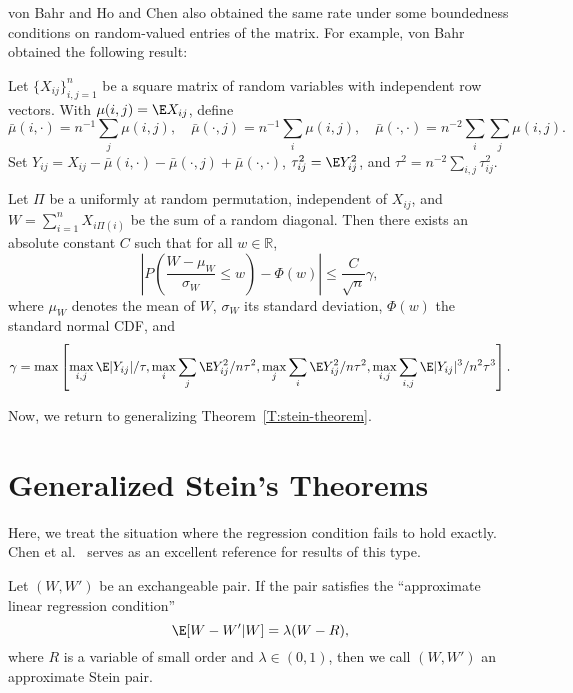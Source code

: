 von Bahr \cite{bahr1976remainder} and Ho and Chen \cite{ho1978l_p}
also obtained the same rate under some boundedness conditions
on random-valued entries of the matrix.  For example, von
Bahr obtained the following result:
\begin{theorem}
  Let $\{X_{ij}\}_{i, j = 1}^n$ be a square matrix of random variables with
  independent row vectors.
  With $\mu(i, j) = \E X_{ij}$, define
  \begin{equation*}
    \bar{\mu}(i, \cdot) = n^{-1} \sum_j \mu(i, j), \quad
    \bar{\mu}(\cdot, j) = n^{-1} \sum_i \mu(i, j), \quad
    \bar{\mu}(\cdot, \cdot) = n^{-2} \sum_i \sum_j \mu(i, j). \quad
  \end{equation*}
  Set $Y_{ij} = X_{ij} - \bar{\mu}(i, \cdot) - \bar{\mu}(\cdot, j) + \bar{\mu}(\cdot, \cdot)$,
  $\tau_{ij}^2 = \E Y_{ij}^2$, and $\tau^2 = n^{-2} \sum_{i, j} \tau_{ij}^2$.

  Let $\Pi$ be a uniformly at random permutation, independent of $X_{ij}$, and
  $W = \sum_{i=1}^n X_{i\Pi(i)}$ be the sum of a random diagonal.
  Then there exists an absolute constant $C$ such that for all $w \in \mathbb{R}$,
  \begin{equation*}
    \left |P \left (\frac{W - \mu_W}{\sigma_W} \leq w \right ) - \Phi(w) \right |
    \leq \frac{C}{\sqrt{n}} \gamma,
  \end{equation*}
  where $\mu_W$ denotes the mean of $W$, $\sigma_W$ its standard deviation,
  $\Phi(w)$ the standard normal CDF, and
  \begin{equation*}
    \gamma = \max \left [
      \max_{i, j} \E |Y_{ij}| / \tau,
      \max_i \sum_j \E Y_{ij}^2 / n \tau^2,
      \max_j \sum_i \E Y_{ij}^2 / n \tau^2,
      \max_{i, j} \sum_{i, j} \E |Y_{ij}|^3 / n^2 \tau^3
    \right ].
  \end{equation*}
\end{theorem}

Now, we return to generalizing Theorem~\ref{T:stein-theorem}.

\section{Generalized Stein's Theorems}
Here, we treat the situation where the regression condition fails to hold exactly.
Chen et al.\ \cite{chen2010normal} serves as an excellent reference for results
of this type.

\begin{definition}
  Let $(W, W')$ be an exchangeable pair.  If the pair satisfies the ``approximate linear
  regression condition''
  \begin{equation}
    \label{D:approx-stein-pair}
    \E [W - W' | W] = \lambda (W - R),
  \end{equation}
  where $R$ is a variable of small order and $\lambda \in (0, 1)$, then we call $(W, W')$ an
  approximate Stein pair.
\end{definition}

